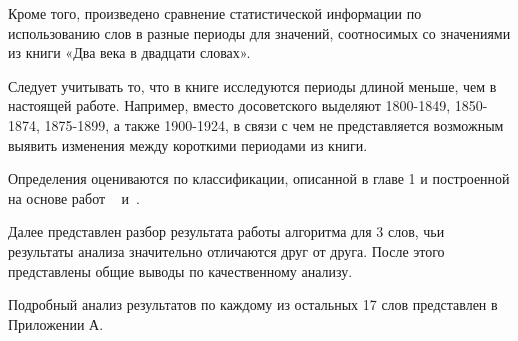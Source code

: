 \documentclass[LI,VKR]{HSEUniversity}
\begin{document}
Кроме того, произведено сравнение статистической информации по использованию слов
в разные периоды для значений, соотносимых со значениями из книги
«Два века в двадцати словах».

Следует учитывать то, что в книге исследуются периоды длиной меньше, чем в настоящей работе.
Например, вместо досоветского выделяют 1800-1849, 1850-1874, 1875-1899, а также 1900-1924,
в связи с чем не представляется возможным выявить изменения между короткими периодами из книги.

Определения оцениваются по классификации, описанной в главе 1 и построенной на основе работ
~\cite{huang-etal-2021-definition} и~\cite{noraset2016definition}.

Далее представлен разбор результата работы алгоритма для 3 слов, чьи результаты анализа
значительно отличаются друг от друга.
После этого представлены общие выводы по качественному анализу.

Подробный анализ результатов по каждому из остальных 17 слов представлен в Приложении А.

%
%
%
\end{document}

